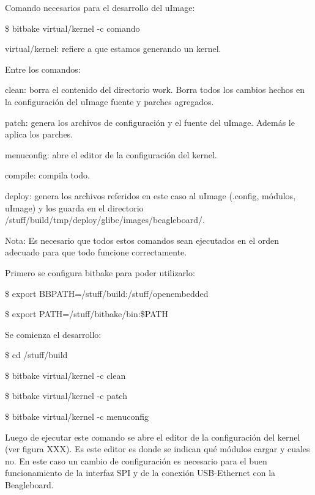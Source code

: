 \bigskip 
Comando necesarios para el desarrollo del uImage:

\bigskip
\centerline{\$ bitbake virtual/kernel -c comando}

\bigskip
virtual/kernel: refiere a que estamos generando un kernel.

\bigskip
Entre los comandos:

\bigskip
clean: borra el contenido del directorio work. Borra todos los cambios hechos en la configuración del uImage fuente y parches agregados.

patch: genera los archivos de configuración y el fuente del uImage. Además le aplica los parches.

menuconfig: abre el editor de la configuración del kernel.

compile: compila todo.

deploy: genera los archivos referidos en este caso al uImage (.config, módulos, uImage) y los guarda en el directorio /stuff/build/tmp/deploy/glibc/images/beagleboard/.

\bigskip
Nota: Es necesario que todos estos comandos sean ejecutados en el orden adecuado para que todo funcione correctamente.

\bigskip
Primero se configura bitbake para poder utilizarlo:

\centerline{\$ export BBPATH=/stuff/build:/stuff/openembedded}

\centerline{\$ export PATH=/stuff/bitbake/bin:\$PATH}

\bigskip
Se comienza el desarrollo:

\centerline{\$ cd /stuff/build}

\centerline{\$ bitbake virtual/kernel -c clean}

\centerline{\$ bitbake virtual/kernel -c patch}

\centerline{\$ bitbake virtual/kernel -c menuconfig}

\bigskip
Luego de ejecutar este comando se abre el editor de la configuración del kernel (ver figura XXX). Es este editor es donde se indican qué módulos cargar y cuales no. En este caso un cambio de  configuración es necesario para el buen funcionamiento de la interfaz SPI y de la conexión USB-Ethernet con la Beagleboard.

